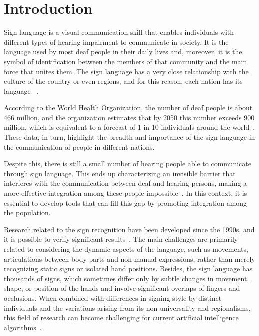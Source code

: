 \section{Introduction} 
\label{sec:introduction}

Sign language is a visual communication skill that enables individuals with different types of hearing impairment to communicate in society. It is the language used by most deaf people in their daily lives and, moreover, it is the symbol of identification between the members of that community and the main force that unites them.  The sign language has a very close relationship with the culture of the country or even regions, and for this reason, each nation has its language ~\cite{pereira-choi-2011}.

According to the World Health Organization, the number of deaf people is about 466 million, and the organization estimates that by 2050 this number exceeds 900 million, which is equivalent to a forecast of 1 in 10 individuals around the world~\cite{who-2018}. These data, in turn, highlight the breadth and importance of the sign language in the communication of people in different nations.

Despite this, there is still a small number of hearing people able to communicate through sign language. This ends up characterizing an invisible barrier that interferes with the communication between deaf and hearing persons, making a more effective integration among these people impossible~\cite{peres-2006}. In this context, it is essential to develop tools that can fill this gap by promoting integration among the population.

Research related to the sign recognition have been developed since the 1990s, and it is possible to verify significant results~\cite{lim-2016,recent-advances-dl-2017}. The main challenges are primarily related to considering the dynamic aspects of the language, such as movements, articulations between body parts and non-manual expressions, rather than merely recognizing static signs or isolated hand positions. Besides, the sign language has thousands of signs, which sometimes differ only by subtle changes in movement, shape, or position of the hands and involve significant overlaps of fingers and occlusions. When combined with differences in signing style by distinct individuals and the variations arising from its non-universality and regionalisms, this field of research can become challenging for current artificial intelligence algorithms~\cite{konstantinidis-2018}.

